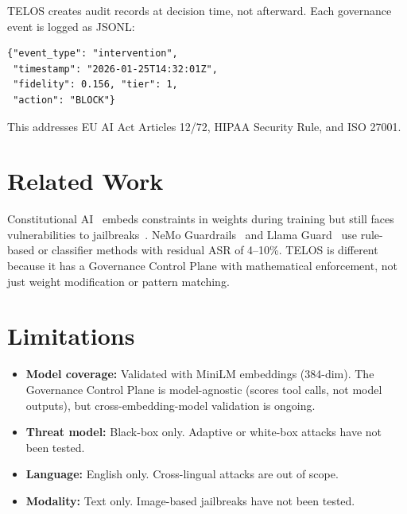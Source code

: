 \documentclass[11pt,twocolumn]{article}
\begin{document}
TELOS creates audit records at decision time, not afterward. Each governance event is logged as JSONL:

\begin{lstlisting}
{"event_type": "intervention",
 "timestamp": "2026-01-25T14:32:01Z",
 "fidelity": 0.156, "tier": 1,
 "action": "BLOCK"}
\end{lstlisting}

This addresses EU AI Act Articles 12/72, HIPAA Security Rule, and ISO 27001.

\section{Related Work}

Constitutional AI~\citep{bai2022constitutional} embeds constraints in weights during training but still faces vulnerabilities to jailbreaks~\citep{wei2023jailbroken}. NeMo Guardrails~\citep{rebedea2023nemo} and Llama Guard~\citep{inan2023llamaguard} use rule-based or classifier methods with residual ASR of 4--10\%. TELOS is different because it has a Governance Control Plane with mathematical enforcement, not just weight modification or pattern matching.

\section{Limitations}

\begin{itemize}
    \item \textbf{Model coverage:} Validated with MiniLM embeddings (384-dim). The Governance Control Plane is model-agnostic (scores tool calls, not model outputs), but cross-embedding-model validation is ongoing.
    \item \textbf{Threat model:} Black-box only. Adaptive or white-box attacks have not been tested.
    \item \textbf{Language:} English only. Cross-lingual attacks are out of scope.
    \item \textbf{Modality:} Text only. Image-based jailbreaks have not been tested.
\end{itemize}
\end{document}

